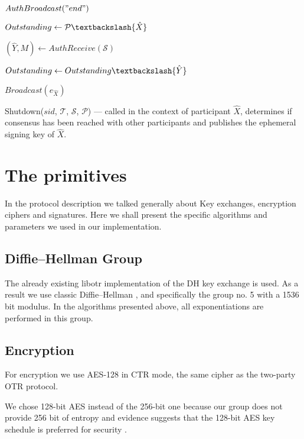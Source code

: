 \begin{algorithm}[H]
{    $AuthBroadcast("end")$
    
    $Outstanding \leftarrow \mathcal{P} \textbackslash \{\hat{X}\}$
    
    {
        $(\hat{Y}, M) \leftarrow AuthReceive(\mathcal{S})$
        
        {
          \Return{$\perp$}
        }
        \Else
        {
          $Outstanding \leftarrow Outstanding \textbackslash \{\hat{Y}\}$
        }                       
    }
    
    $Broadcast(e_{\hat{X}})$
    
  }
  \caption{Shutdown($sid$, $\mathcal{T}$, $\mathcal{S}$, $\mathcal{P}$) --- called in the context of participant $\hat{X}$, determines if consensus has been reached with other participants and publishes the ephemeral signing key of $\hat{X}$.}
  \label{algo:shutdown}
\end{algorithm}

\section{The primitives}
\label{setions:Protocol:primitives}
In the protocol description we talked generally about \dhname Key exchanges, encryption ciphers and signatures.
Here we shall present the specific algorithms and parameters we used in our implementation.

\subsection{Diffie--Hellman Group}
The already existing libotr implementation of the DH key exchange is used.
As a result we use classic Diffie--Hellman , and specifically the group no. 5 \cite{website:dh-rfc} with a 1536 bit modulus.
In the algorithms presented above, all exponentiations are performed in this group.

\subsection{Encryption}

For encryption we use AES-128 in CTR mode, the same cipher as the two-party OTR protocol.

We chose 128-bit AES instead of the 256-bit one because our \dhname group does not provide 256 bit of entropy and evidence suggests that the 128-bit AES key schedule is preferred for security \cite{aes-key-recov} \cite{rijndael-improved-analysis}.

